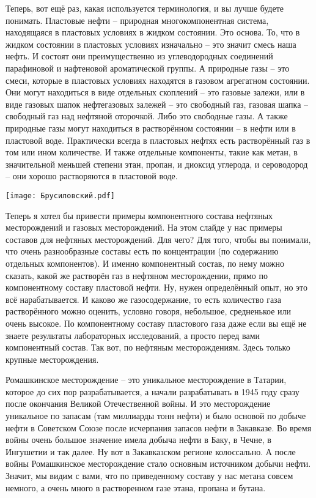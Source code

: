 \documentclass[main.tex]{subfiles}
\begin{document}
Теперь, вот ещё раз, какая используется терминология, и вы лучше будете понимать.
Пластовые нефти -- природная многокомпонентная система, находящаяся в пластовых условиях в жидком состоянии.
Это основа.
То, что в жидком состоянии в пластовых условиях изначально -- это значит смесь наша нефть.
И состоят они преимущественно из углеводородных соединений парафиновой и нафтеновой ароматической группы.
А природные газы -- это смеси, которые в пластовых условиях находятся в газовом агрегатном состоянии.
Они могут находиться в виде отдельных скоплений -- это газовые залежи, или в виде газовых шапок нефтегазовых залежей -- это свободный газ, газовая шапка -- свободный газ над нефтяной оторочкой.
Либо это свободные газы.
А также природные газы могут находиться в растворённом состоянии -- в нефти или в пластовой воде.
Практически всегда в пластовых нефтях есть растворённый газ в том или ином количестве.
И также отдельные компоненты, такие как метан, в значительной меньшей степени этан, пропан,
и диоксид углерода, и сероводород -- они хорошо растворяются в пластовой воде.

\begin{center}
\texttt{[image: Брусиловский.pdf]}
\end{center}

Теперь я хотел бы привести примеры компонентного состава нефтяных месторождений и газовых месторождений.
На этом слайде у нас примеры составов для нефтяных месторождений.
Для чего?
Для того, чтобы вы понимали, что очень разнообразные составы есть по концентрации (по содержанию отдельных компонентов).
И именно компонентный состав, по нему можно сказать, какой же растворён газ в нефтяном месторождении, прямо по компонентному составу пластовой нефти.
Ну, нужен определённый опыт, но это всё нарабатывается.
И каково же газосодержание, то есть количество газа растворённого можно оценить, условно говоря, небольшое, средненькое или очень высокое.
По компонентному составу пластового газа даже если вы ещё не знаете результаты лабораторных исследований, а просто перед вами компонентный состав.
Так вот, по нефтяным месторождениям.
Здесь только крупные месторождения.

Ромашкинское месторождение -- это уникальное месторождение в Татарии, которое до сих пор разрабатывается, а начали разрабатывать в 1945 году сразу после окончания Великой Отечественной войны.
И это месторождение уникальное по запасам (там миллиарды тонн нефти) и было основой по добыче нефти в Советском Союзе после исчерпания запасов нефти в Закавказе.
Во время войны очень большое значение имела добыча нефти в Баку, в Чечне, в Ингушетии и так далее.
Ну вот в Закавказском регионе колоссально.
А после войны Ромашкинское месторождение стало основным источником добычи нефти.
Значит, мы видим с вами, что по приведенному составу у нас метана совсем немного, а очень много в растворенном газе этана, пропана и бутана.
\end{document}

